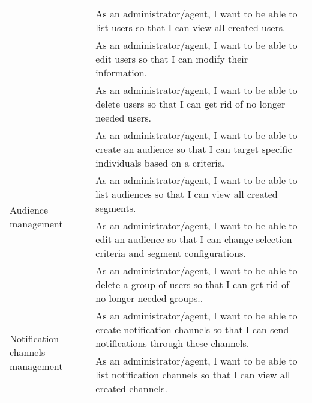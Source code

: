 \begin{longtable}{ | m{}  | m{} | }
      \cline{2-2}
                                                              & As an administrator/agent, I want to be able to list users so that I can view all created users.                                                                      \\
      \cline{2-2}
                                                              & As an administrator/agent, I want to be able to edit users so that I can modify their information.                                                                    \\
      \cline{2-2}
                                                              & As an administrator/agent, I want to be able to delete users so that I can get rid of no longer needed users.                                                         \\
      \hline
      \multirow[t]{4}{5em}{Audience management}               & As an administrator/agent, I want to be able to create an audience so that I can target specific individuals based on a criteria.                                     \\
      \cline{2-2}
                                                              & As an administrator/agent, I want to be able to list audiences so that I can view all created segments.                                                               \\
      \cline{2-2}
                                                              & As an administrator/agent, I want to be able to edit an audience so that I can change selection criteria and segment configurations.                                  \\
      \cline{2-2}
                                                              & As an administrator/agent, I want to be able to delete a group of users so that I can get rid of no longer needed groups..                                            \\
      \hline
      \multirow[t]{4}{5em}{Notification channels management}  & As an administrator/agent, I want to be able to create notification channels so that I can send notifications through these channels.                                 \\
      \cline{2-2}
                                                              & As an administrator/agent, I want to be able to list notification channels so that I can view all created channels.                                                   \\

\end{longtable}
